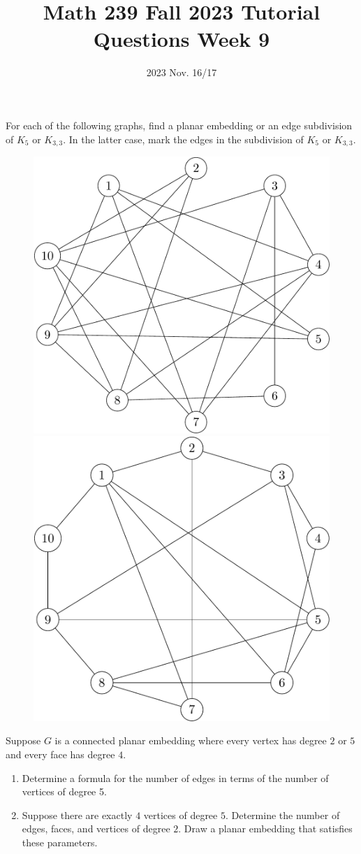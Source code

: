 \title{Math 239 Fall 2023 Tutorial Questions Week 9}

\date{2023 Nov. 16/17}
\maketitle

\begin{enumerate}
    For each of the following graphs, find a planar embedding or an edge subdivision of $K_5$ or $K_{3,3}$. In the latter case, mark the edges in the subdivision of $K_5$ or $K_{3,3}$. 
    \begin{figure}[h]
        \centering
        \includegraphics[width=.45\textwidth]{planar.png}\hfill
        \includegraphics[width=.45\textwidth]{nonplanar.png}
    \end{figure}
    
     Suppose $G$ is a connected planar embedding where every vertex has degree $2$ or $5$ and every face has degree $4$.
    \begin{enumerate}
        \item Determine a formula for the number of edges in terms of the number of vertices of degree 5.
        \item Suppose there are exactly $4$ vertices of degree $5$. Determine the number of edges, faces, and vertices of degree $2$. Draw a planar embedding that satisfies these parameters.
    \end{enumerate}


\end{enumerate}
